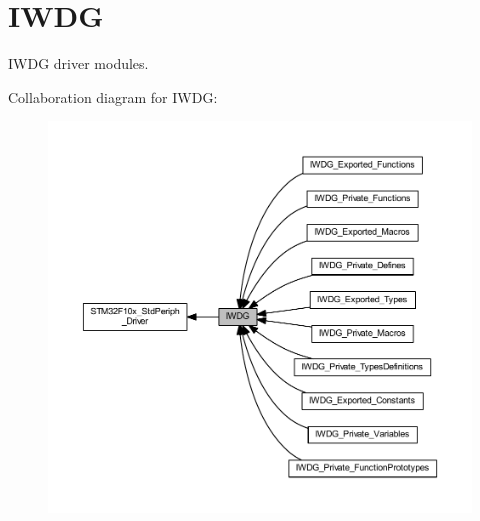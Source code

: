 \hypertarget{group___i_w_d_g}{}\section{I\+W\+DG}
\label{group___i_w_d_g}


I\+W\+DG driver modules.  


Collaboration diagram for I\+W\+DG\+:
\nopagebreak
\begin{figure}[H]
\begin{center}
\leavevmode
\includegraphics[width=350pt]{group___i_w_d_g}
\end{center}
\end{figure}
